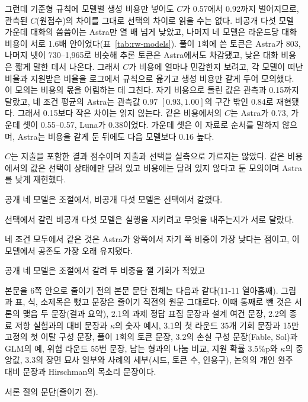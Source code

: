 그런데 기준형 규칙에 모델별 생성 비용만 넣어도 $C$가 0.57에서 0.92까지 벌어지므로, 관측된 $C$(원점수)의 차이를 그대로 선택의 차이로 읽을 수는 없다. 비공개 다섯 모델 가운데 대화의 씀씀이는 Astra만 열 배 넘게 낮았고, 나머지 네 모델은 라운드당 대화 비용이 서로 1.6배 안이었다(표~\ref{tab:rw-models}). 풀이 1회에 쓴 토큰은 Astra가 803, 나머지 넷이 730--1,965로 비슷해 추론 토큰은 Astra에서도 차감됐고, 낮은 대화 비용은 짧게 말한 데서 나온다. 그래서 $C$가 비용에 얼마나 민감한지 보려고, 각 모델이 떠난 비율과 지원받은 비율을 로그에서 규칙으로 옮기고 생성 비용만 같게 두어 모의했다. 이 모의는 비용의 몫을 어림하는 데 그친다. 자기 비용으로 돌린 값은 관측과 0.15까지 달랐고, 네 조건 평균의 Astra는 관측값 0.97 $[0.93,1.00]$의 구간 밖인 0.84로 재현됐다. 그래서 0.15보다 작은 차이는 읽지 않는다. 같은 비용에서의 $C$는 Astra가 0.73, 가운데 셋이 0.55--0.57, Luna가 0.38이었다. 가운데 셋은 이 자료로 순서를 말하지 않으며, Astra는 비용을 같게 둔 뒤에도 다음 모델보다 0.16 높다.

$C$는 지출을 포함한 결과 점수이며 지출과 선택을 실측으로 가르지는 않았다. 같은 비용에서의 값은 선택이 상태에만 달려 있고 비용에는 달려 있지 않다고 둔 모의이며 Astra를 낮게 재현했다.

공개 네 모델은 조절에서, 비공개 다섯 모델은 선택에서 갈렸다.

선택에서 갈린 비공개 다섯 모델은 실행을 지키려고 무엇을 내주는지가 서로 달랐다.

네 조건 모두에서 같은 것은 Astra가 양쪽에서 자기 쪽 비중이 가장 낮다는 점이고, 이 모델에서 공존도 가장 오래 유지됐다.

공개 네 모델은 조절에서 갈려 두 비중을 잴 기회가 적었고

본문을 6쪽 안으로 줄이기 전의 본문 문단 전체는 다음과 같다(11-11 열아홉째). 그림과 표, 식, 소제목은 뺐고 문장은 줄이기 직전의 원문 그대로다. 이때 통째로 뺀 것은 서론의 맺음 두 문장(결과 요약), 2.1의 과제 정답 표집 문장과 설계 여건 문장, 2.2의 종료 저항 실험과의 대비 문장과 $\kappa$의 숫자 예시, 3.1의 첫 라운드 35개 기회 문장과 15만 고정의 첫 이탈 구성 문장, 풀이 1회의 토큰 문장, 3.2의 손실 구성 문장(Fable, Sol)과 GLM의 예, 위험 라운드 55번 문장, 남는 형과의 나눔 비교, 지원 확률 3.5\%p와 $\kappa$의 중앙값, 3.3의 장면 묘사 일부와 사례의 세부(시드, 토큰 수, 인용구), 논의의 개인 완주 대비 문장과 Hirschman의 목소리 문장이다.

서론 절의 문단(줄이기 전).


